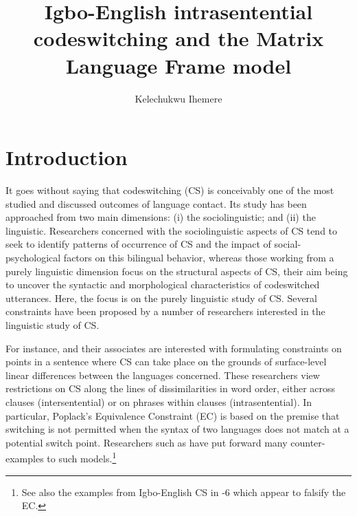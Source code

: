 \documentclass[output=paper]{langsci/langscibook}
\title{Igbo-English intrasentential codeswitching and the Matrix Language Frame model}
\author{%
 Kelechukwu Ihemere \affiliation{University of Westminster, London UK}
}
\begin{document}



 


\section{Introduction}

It goes without saying that codeswitching (CS) is conceivably one of the most studied and discussed outcomes of language contact. Its study has been approached from two main dimensions: (i) the sociolinguistic; and (ii) the linguistic. Researchers concerned with the sociolinguistic aspects of CS tend to seek to identify patterns of occurrence of CS and the impact of social-psychological factors on this bilingual behavior, whereas those working from a purely linguistic dimension focus on the structural aspects of CS, their aim being to uncover the syntactic and morphological characteristics of codeswitched utterances. Here, the focus is on the purely linguistic study of CS. Several constraints have been proposed by a number of researchers interested in the linguistic study of CS.  

For instance, \citet{PoplackMeechan1998} and their associates are interested with formulating constraints on points in a sentence where CS can take place on the grounds of surface-level linear differences between the languages concerned. These researchers view restrictions on CS along the lines of dissimilarities in word order, either across clauses (intersentential) or on phrases within clauses (intrasentential). In particular, Poplack’s Equivalence Constraint (EC) is based on the premise that switching is not permitted when the syntax of two languages does not match at a potential switch point. Researchers such as \citet{Bhatt2001} have put forward many counter-examples to such models.\footnote{ See also the examples from Igbo-English CS in -6 which appear to falsify the EC.} 
\end{document}
